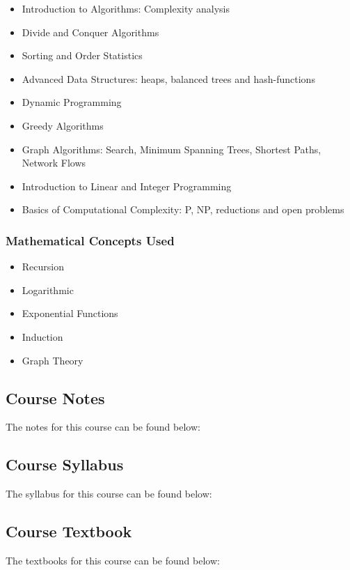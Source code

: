 {\begin{highlight}[\CSPBAlgo]
        \begin{itemize}
            \item Introduction to Algorithms: Complexity analysis
            \item Divide and Conquer Algorithms
            \item Sorting and Order Statistics
            \item Advanced Data Structures: heaps, balanced trees and hash-functions
            \item Dynamic Programming
            \item Greedy Algorithms
            \item Graph Algorithms: Search, Minimum Spanning Trees, Shortest Paths, Network Flows
            \item Introduction to Linear and Integer Programming
            \item Basics of Computational Complexity: P, NP, reductions and open problems
        \end{itemize}
    
        \subsubsection*{Mathematical Concepts Used}
        
        \begin{itemize}
            \item Recursion
            \item Logarithmic
            \item Exponential Functions
            \item Induction
            \item Graph Theory
        \end{itemize}
    \end{highlight}
}

\subsection{Course Notes}

The notes for this course can be found below: \coursedoc{\CSPBAlgoCourseNotes}

\subsection{Course Syllabus}

The syllabus for this course can be found below: \coursedoc{\CSPBAlgoSyllabus}

\subsection{Course Textbook}

The textbooks for this course can be found below: \coursedoc{\CSPBAlgoGrokkingTextbook} \coursedoc{\CSPBAlgoIntroTextbook}